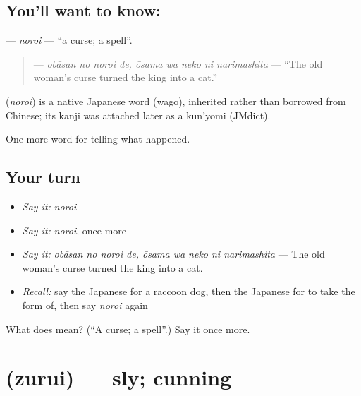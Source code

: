 \subsection*{You'll want to know: }
\textbf{} — \emph{noroi} — \textquotedblleft{}a curse; a spell\textquotedblright{}.

\begin{quote}
\textbf{   } — \emph{obāsan no noroi de, ōsama wa neko ni narimashita} — \textquotedblleft{}The old woman's curse turned the king into a cat.\textquotedblright{}
\end{quote}

\begin{cousinweb}
\textbf{} (\emph{noroi}) is a native Japanese word (wago), inherited rather than borrowed from Chinese; its kanji was attached later as a kun'yomi (JMdict).
\end{cousinweb}

\begin{grammarlens}[title={What you've built}]
One more word for telling what happened.
\end{grammarlens}

\subsection*{Your turn}
\begin{itemize}
\raggedright
  \item \emph{Say it:} \emph{noroi}
  \item \emph{Say it:} \emph{noroi}, once more
  \item \emph{Say it:} \emph{obāsan no noroi de, ōsama wa neko ni narimashita} — The old woman's curse turned the king into a cat.
  \item \emph{Recall:} say the Japanese for a raccoon dog, then the Japanese for to take the form of, then say \emph{noroi} again
\end{itemize}

\begin{tcolorbox}[breakable,colback=teal!4,colframe=teal!35!black,title={Before you move on}]
What does  mean? (\textquotedblleft{}A curse; a spell\textquotedblright{}.) Say it once more.
\end{tcolorbox}
\section[\texorpdfstring{\ja{ずるい} (zurui)}{ずるい (zurui)}]{ (zurui) — sly; cunning}

